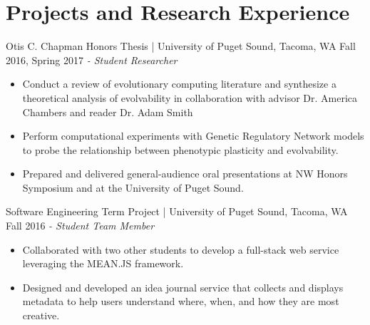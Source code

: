 \section{Projects and Research Experience}

Otis C. Chapman Honors Thesis | University of Puget Sound, Tacoma, WA \hfill Fall 2016, Spring 2017 \newline
\textit{- Student Researcher} \\
  \vspace{-4.5mm}
 \begin{itemize}
 \item Conduct a review of evolutionary computing literature and synthesize a theoretical analysis of evolvability in collaboration with advisor Dr. America Chambers and reader Dr. Adam Smith
 \item Perform computational experiments with Genetic Regulatory Network models to probe the relationship between phenotypic plasticity and evolvability.
 \item Prepared and delivered general-audience oral presentations at NW Honors Symposium and at the University of Puget Sound.
 \end{itemize}
  \vspace{-3.5mm}

Software Engineering Term Project | University of Puget Sound, Tacoma, WA \hfill Fall 2016 \newline
\textit{- Student Team Member} \\
  \vspace{-4.5mm}
 \begin{itemize}
 \item Collaborated with two other students to develop a full-stack web service leveraging the MEAN.JS framework.
 \item Designed and developed an idea journal service that collects and displays metadata to help users understand where, when, and how they are most creative.
 \end{itemize}
  \vspace{-3.5mm}

